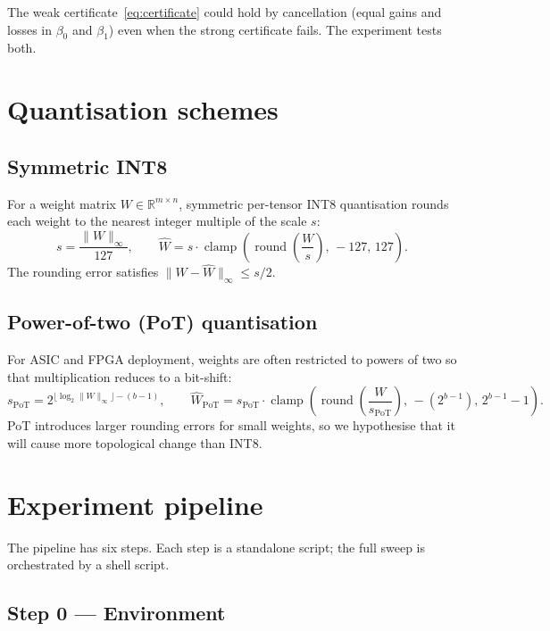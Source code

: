 \documentclass[11pt]{article}
\newcommand{\R}{\mathbb{R}}
\begin{document}
The weak certificate~\eqref{eq:certificate} could hold by cancellation (equal gains
and losses in $\beta_0$ and $\beta_1$) even when the strong certificate fails.
The experiment tests both.

\section{Quantisation schemes}

\subsection{Symmetric INT8}

For a weight matrix $W \in \R^{m \times n}$, symmetric per-tensor INT8 quantisation
rounds each weight to the nearest integer multiple of the scale $s$:
\begin{equation}
s = \frac{\|W\|_\infty}{127}, \qquad
\hat{W} = s \cdot \operatorname{clamp}\!\left(\operatorname{round}\!\left(\frac{W}{s}\right),\, -127,\, 127\right).
\label{eq:int8}
\end{equation}
The rounding error satisfies $\|W - \hat{W}\|_\infty \leq s/2$.

\subsection{Power-of-two (PoT) quantisation}

For ASIC and FPGA deployment, weights are often restricted to powers of two so that
multiplication reduces to a bit-shift:
\begin{equation}
s_{\mathrm{PoT}} = 2^{\lfloor \log_2 \|W\|_\infty \rfloor - (b-1)},
\qquad
\hat{W}_{\mathrm{PoT}} = s_{\mathrm{PoT}} \cdot
\operatorname{clamp}\!\left(\operatorname{round}\!\left(\frac{W}{s_{\mathrm{PoT}}}\right),\,
-(2^{b-1}),\, 2^{b-1}-1\right).
\label{eq:pot}
\end{equation}
PoT introduces larger rounding errors for small weights, so we hypothesise that it
will cause more topological change than INT8.

\section{Experiment pipeline}

The pipeline has six steps. Each step is a standalone script; the full sweep is
orchestrated by a shell script.

\subsection{Step 0 — Environment}
\end{document}

